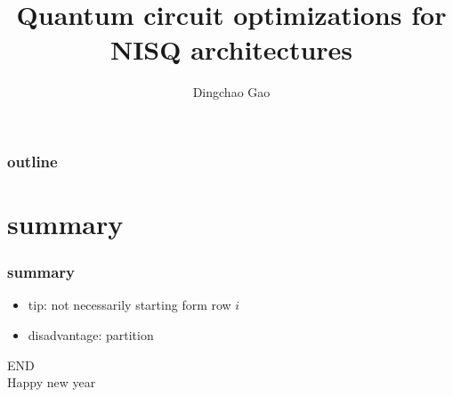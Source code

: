 \documentclass[aspectratio=1610]{beamer}
\title[a circuit synthesis]{Quantum circuit optimizations for NISQ architectures}
\author[Gcc]{Dingchao Gao}
\institute[ISCAS]{Institute of Software Chinese Academy of Sciences}
\begin{document}
\begin{frame}[plain]
  \titlepage
\end{frame}

\begin{frame}
	\frametitle{outline}
  \printbibliography
\end{frame}



\section*{summary}
\begin{frame}
  \frametitle{summary}
  \begin{itemize}
    \item tip: not necessarily starting form row $i$
    \item disadvantage: partition
  \end{itemize}
\end{frame}


\begin{frame}
\centering
\Huge{END\\Happy new year}
\end{frame}
\end{document}
